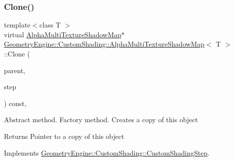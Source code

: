 \subsubsection{\texorpdfstring{Clone()}{Clone()}}
{\footnotesize\ttfamily template$<$class T $>$ \\
virtual \mbox{\hyperlink{class_geometry_engine_1_1_custom_shading_1_1_alpha_multi_texture_shadow_map}{Alpha\+Multi\+Texture\+Shadow\+Map}}$\ast$ \mbox{\hyperlink{class_geometry_engine_1_1_custom_shading_1_1_alpha_multi_texture_shadow_map}{Geometry\+Engine\+::\+Custom\+Shading\+::\+Alpha\+Multi\+Texture\+Shadow\+Map}}$<$ T $>$\+::Clone (\begin{DoxyParamCaption}\item[{\mbox{\hyperlink{class_geometry_engine_1_1_custom_shading_1_1_custom_shading_interface}{Custom\+Shading\+Interface}} $\ast$}]{parent,  }\item[{\mbox{\hyperlink{namespace_geometry_engine_1_1_custom_shading_a2dc236a5b567da5099069ce2b2be5609}{Custom\+Shading\+Steps}}}]{step }\end{DoxyParamCaption}) const\hspace{0.3cm}{\ttfamily [inline]}, {\ttfamily [virtual]}}

Abstract method. Factory method. Creates a copy of this object \begin{DoxyReturn}{Returns}
Pointer to a copy of this object 
\end{DoxyReturn}


Implements \mbox{\hyperlink{class_geometry_engine_1_1_custom_shading_1_1_custom_shading_step_aa9279c195d3a8f294860a431508675c3}{Geometry\+Engine\+::\+Custom\+Shading\+::\+Custom\+Shading\+Step}}.

\mbox{\label{class_geometry_engine_1_1_custom_shading_1_1_alpha_multi_texture_shadow_map_a6bd8b95d6b83ac8513e4885899c33a19}} 
